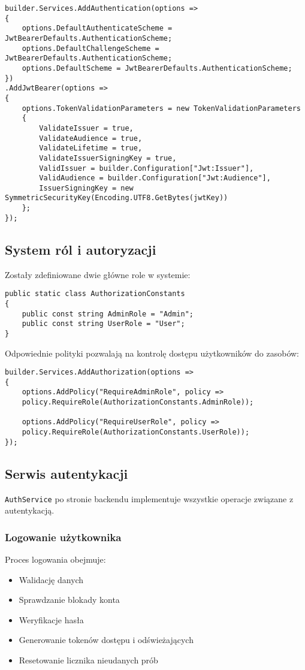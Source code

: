 \begin{lstlisting}[style=csharp, caption={Konfiguracja JWT w Program.cs}]
builder.Services.AddAuthentication(options =>
{
	options.DefaultAuthenticateScheme = JwtBearerDefaults.AuthenticationScheme;
	options.DefaultChallengeScheme = JwtBearerDefaults.AuthenticationScheme;
	options.DefaultScheme = JwtBearerDefaults.AuthenticationScheme;
})
.AddJwtBearer(options =>
{
	options.TokenValidationParameters = new TokenValidationParameters
	{
		ValidateIssuer = true,
		ValidateAudience = true,
		ValidateLifetime = true,
		ValidateIssuerSigningKey = true,
		ValidIssuer = builder.Configuration["Jwt:Issuer"],
		ValidAudience = builder.Configuration["Jwt:Audience"],
		IssuerSigningKey = new SymmetricSecurityKey(Encoding.UTF8.GetBytes(jwtKey))
	};
});
\end{lstlisting}

\subsection{System ról i autoryzacji}
Zostały zdefiniowane dwie główne role w systemie:

\begin{lstlisting}[style=csharp, caption={Role w systemie}]
public static class AuthorizationConstants
{
	public const string AdminRole = "Admin";
	public const string UserRole = "User";
}
\end{lstlisting}

Odpowiednie polityki pozwalają na kontrolę dostępu użytkowników do zasobów:

\begin{lstlisting}[style=csharp, caption={Polityki autoryzacji}]
builder.Services.AddAuthorization(options =>
{
	options.AddPolicy("RequireAdminRole", policy =>
	policy.RequireRole(AuthorizationConstants.AdminRole));
	
	options.AddPolicy("RequireUserRole", policy =>
	policy.RequireRole(AuthorizationConstants.UserRole));
});
\end{lstlisting}

\subsection{Serwis autentykacji}
\texttt{AuthService} po stronie backendu implementuje wszystkie operacje związane z autentykacją.

\subsubsection{Logowanie użytkownika}
Proces logowania obejmuje:
\begin{itemize}
	\item Walidację danych
	\item Sprawdzanie blokady konta
	\item Weryfikacje hasła
	\item Generowanie tokenów dostępu i odświeżających
	\item Resetowanie licznika nieudanych prób
\end{itemize}

